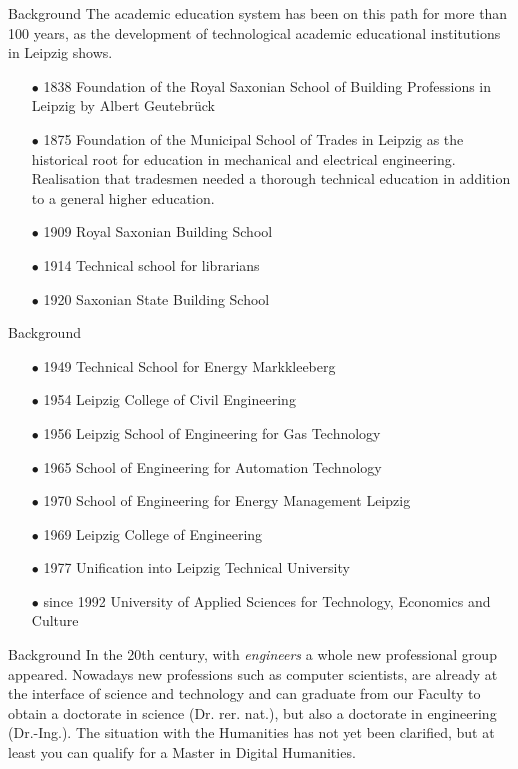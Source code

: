 \documentclass{beamer}
\begin{document}
\begin{frame}{Background}
The academic education system has been on this path for more than 100 years,
as the development of technological academic educational institutions in
Leipzig shows.
\begin{itemize}
\item[$\bullet$] 1838 Foundation of the Royal Saxonian School of Building
  Professions in Leipzig by Albert Geutebrück
\item[$\bullet$] 1875 Foundation of the Municipal School of Trades in Leipzig
  as the historical root for education in mechanical and electrical
  engineering.  Realisation that tradesmen needed a thorough technical
  education in addition to a general higher education.
\item[$\bullet$] 1909 Royal Saxonian Building School
\item[$\bullet$] 1914 Technical school for librarians
\item[$\bullet$] 1920 Saxonian State Building School
\end{itemize}
\end{frame}

\begin{frame}{Background}
\begin{itemize}
\item[$\bullet$] 1949 Technical School for Energy Markkleeberg
\item[$\bullet$] 1954 Leipzig College of Civil Engineering
\item[$\bullet$] 1956 Leipzig School of Engineering for Gas Technology
\item[$\bullet$] 1965 School of Engineering for Automation Technology
\item[$\bullet$] 1970 School of Engineering for Energy Management Leipzig
\item[$\bullet$] 1969 Leipzig College of Engineering
\item[$\bullet$] 1977 Unification into Leipzig Technical University
\item[$\bullet$] since 1992 University of Applied Sciences for Technology,
  Economics and Culture
\end{itemize}
\end{frame}

\begin{frame}{Background}
In the 20th century, with \emph{engineers} a whole new professional group
appeared.  Nowadays new professions such as computer scientists, are already
at the interface of science and technology and can graduate from our Faculty
to obtain a doctorate in science (Dr. rer. nat.), but also a doctorate in
engineering (Dr.-Ing.).  The situation with the Humanities has not yet been
clarified, but at least you can qualify for a Master in Digital Humanities.
\end{frame}
\end{document}
